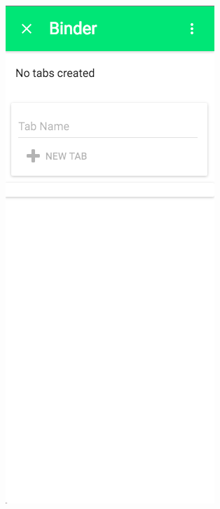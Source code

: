 \begin{figure}
\begin{subfigure}{.5\textwidth}
  \centering
  \includegraphics[width=.8\linewidth]{Figures/BinderEmpty.png}
  \caption{}
  \label{fig:binderempty}
\end{subfigure}%
\begin{subfigure}{.5\textwidth}

\end{subfigure}
\end{figure}
